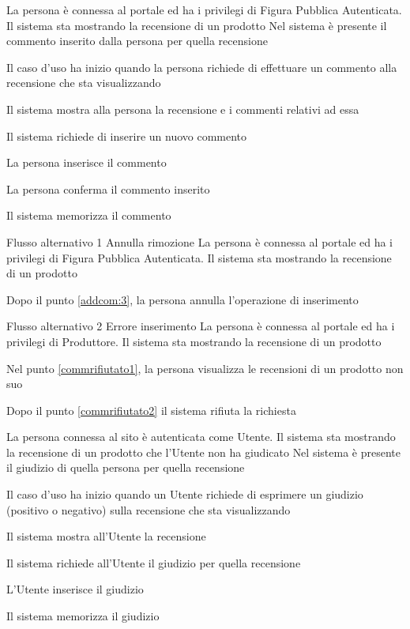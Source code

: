 
{}
{La persona è connessa al portale ed ha i privilegi di Figura Pubblica Autenticata. Il sistema sta mostrando la recensione di un prodotto}
{Nel sistema è presente il commento inserito dalla persona per quella recensione}
{\begin{enumCU}
	\item Il caso d'uso ha inizio quando la persona richiede di effettuare un commento alla recensione che sta visualizzando\label{commrifiutato2}
	\item Il sistema mostra alla persona la recensione e i commenti relativi ad essa
	\item Il sistema richiede di inserire un nuovo commento 
	\item La persona inserisce il commento\label{addcom:3}
	\item La persona conferma il commento inserito
	\item Il sistema memorizza il commento
\end{enumCU}}
%
{Flusso alternativo 1}%
{Annulla rimozione}%
{La persona è connessa al portale ed ha i privilegi di Figura Pubblica Autenticata. Il sistema sta mostrando la recensione di un prodotto}
{\postNulle}%
{\begin{enumCU}
		\item Dopo il punto \ref{addcom:3}, la persona annulla l'operazione di inserimento
	\end{enumCU}}%
%
{Flusso alternativo 2}%
{Errore inserimento}%
{La persona è connessa al portale ed ha i privilegi di Produttore. Il sistema sta mostrando la recensione di un prodotto}
{\postNulle}%
{\begin{enumCU}
		\item Nel punto \ref{commrifiutato1}, la persona visualizza le recensioni di un prodotto non suo
		\item Dopo il punto \ref{commrifiutato2} il sistema rifiuta la richiesta
	\end{enumCU}}%


{}
{La persona connessa al sito è autenticata  come Utente. Il sistema sta mostrando la recensione di un prodotto che l'Utente non ha giudicato}
{Nel sistema è presente il giudizio di quella persona per quella recensione}
{\begin{enumCU}
	\item Il caso d'uso ha inizio quando un Utente richiede di esprimere un giudizio (positivo o negativo) sulla recensione che sta visualizzando
	\item Il sistema mostra all'Utente la recensione
	\item Il sistema richiede all'Utente il giudizio per quella recensione
	\item L'Utente inserisce il giudizio
	\item Il sistema memorizza il giudizio
\end{enumCU}}



